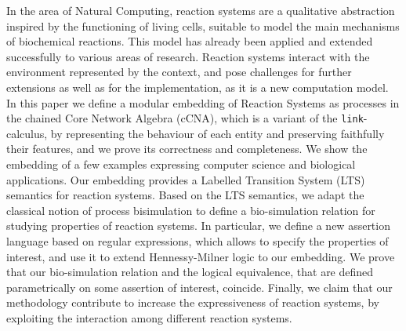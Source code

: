 
In the area of Natural Computing, reaction systems are
a qualitative abstraction inspired by the 
functioning of living cells, suitable to model the main
mechanisms of biochemical reactions.
This model has already been applied
and extended successfully to various areas of research. Reaction 
systems interact with the environment represented by the context, and
pose challenges for further extensions as well as
for the implementation, as it is a new computation model. 
In this paper {\color{red} we define a modular embedding of Reaction Systems as processes
in the chained Core Network Algebra (cCNA), which is a variant  of the  {\tt link}-calculus,
by representing the behaviour of each entity and
preserving faithfully their features, and we prove its correctness and completeness.}
{\color{red} We show} the embedding of 
a few examples expressing computer science
and biological applications. 
{\color{red}Our embedding provides a Labelled Transition System (LTS) semantics for reaction systems. Based on the LTS semantics, we adapt  the classical notion of  process bisimulation to define a bio-simulation relation for studying properties of reaction systems.}
In particular, we define a new assertion language based on regular expressions, 
which allows to specify the properties of interest, and use it to extend Hennessy-Milner logic
to our {\color{red} embedding.}
{\color{red} We prove that our bio-simulation relation and the logical equivalence, that are defined parametrically on some assertion of interest, coincide.}
Finally, 
{\color{red} we claim that}
our methodology 
contribute to increase the expressiveness
of reaction systems, by exploiting the interaction among 
different reaction systems. 
